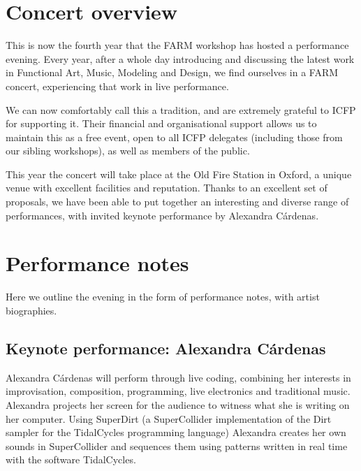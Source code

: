\documentclass[sigplan,10pt,review]{acmart}\settopmatter{printfolios=true}
\begin{document}



\maketitle

\section{Concert overview}

This is now the fourth year that the FARM workshop has hosted a
performance evening. Every year, after a whole day introducing and
discussing the latest work in Functional Art, Music, Modeling and
Design, we find ourselves in a FARM concert, experiencing that work in
live performance. 

We can now comfortably call this a tradition, and are extremely
grateful to ICFP for supporting it. Their financial and organisational
support allows us to maintain this as a free event, open to all
ICFP delegates (including those from our sibling workshops), as well
as members of the public. 

This year the concert will take place at the Old Fire Station in
Oxford, a unique venue with excellent facilities and
reputation. Thanks to an excellent set of proposals, we have been able
to put together an interesting and diverse range of performances, with
invited keynote performance by Alexandra C\'{a}rdenas.

\section{Performance notes}

Here we outline the evening in the form of performance notes, with 
artist biographies.

\subsection{Keynote performance: Alexandra C\'ardenas}

Alexandra C\'{a}rdenas will perform through live coding, combining her
interests in improvisation, composition, programming, live electronics
and traditional music. Alexandra projects her screen for the audience
to witness what she is writing on her computer. Using SuperDirt (a
SuperCollider implementation of the Dirt sampler for the TidalCycles
programming language) Alexandra creates her own sounds in
SuperCollider and sequences them using patterns written in real time
with the software TidalCycles.
\end{document}
